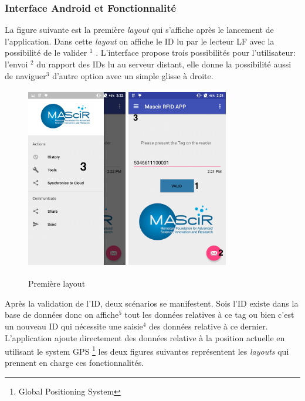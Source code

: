 \documentclass[11pt, a4paper, twoside]{book}
\begin{document}
\subsubsection{Interface Android et Fonctionnalité}
La figure suivante est la première \emph{layout} qui s'affiche après le lancement de l'application. Dans cette \emph{layout} on affiche le ID lu par le lecteur LF avec la possibilité de le valider \(^{1}\) . L'interface propose trois possibilités pour l'utilisateur: l'envoi \(^{2}\) du rapport des IDs lu au serveur distant, elle donne la possibilité aussi de naviguer\(^{3}\) d'autre option avec un simple glisse à droite.
\begin{figure}[H]
\centering
\includegraphics[width=4.4cm,height=8cm]{rightmenu}
\includegraphics[width=4.4cm,height=8cm]{1}
\caption{Première layout}
\end{figure}

Après la validation de l'ID, deux scénarios se manifestent. Sois l'ID existe dans la base de données donc on affiche\(^{5}\) tout les données relatives à ce tag ou bien c'est un nouveau ID qui nécessite une saisie\(^{4}\) des données relative à ce dernier. L'application ajoute directement des données relative à la position actuelle en utilisant le system GPS \footnote{Global Positioning System} les deux figures suivantes représentent les \emph{layouts} qui prennent en charge ces fonctionnalités.
\end{document}
